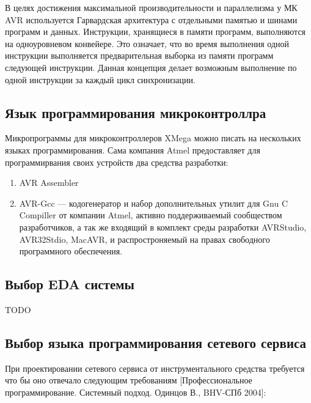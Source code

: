 В целях достижения максимальной производительности и параллелизма у МК AVR используется Гарвардская архитектура с отдельными памятью и шинами программ и данных. Инструкции, хранящиеся в памяти программ, выполняются на одноуровневом конвейере. Это означает, что во время выполнения одной инструкции выполняется предварительная выборка из памяти программ следующей инструкции. Данная концепция делает возможным выполнение по одной инструкции за каждый цикл синхронизации.



\subsection{Язык программирования микроконтроллра}
Микропрограммы для микроконтроллеров XMega можно писать на нескольких языках программирования.
Сама компания Atmel предоставляет для программирвания своих устройств два средства разработки:
	\begin{enumerate}
		\item{}AVR Assembler
		\item{}AVR-Gcc --- кодогенератор и набор дополнительных утилит для Gnu C Compiller от компании Atmel, активно поддерживаемый сообществом разработчиков, а так же входящий в комплект среды разработки AVRStudio, AVR32Stdio, MacAVR, и распростроняемый на правах свободного программного обеспечения.
	\end{enumerate}



\subsection{Выбор EDA системы}
TODO

\subsection{Выбор языка программирования сетевого сервиса}

При проектировании сетевого сервиса от инструментального средства требуется что бы оно отвечало следующим требованиям [Профессиональное программирование. Системный подход. Одинцов В., BHV-СПб 2004]:

